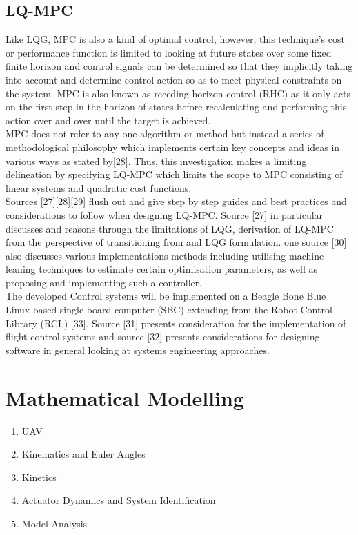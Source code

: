 \documentclass[12pt,a4paper,twoside]{report}
\begin{document}
			\subsection*{LQ-MPC}
				Like LQG, MPC is also a kind of optimal control, however, this technique’s cost or performance function is limited to looking at future states over some fixed finite horizon and control signals can be determined so that they implicitly taking into account and determine control action so as to meet physical constraints on the system. MPC is also known as receding horizon control (RHC) as it only acts on the first step in the horizon of states before recalculating and performing this action over and over until the target is achieved.
				\\ 
				MPC does not refer to any one algorithm or method but instead a series of methodological philosophy which implements certain key concepts and ideas in various ways as stated by[28]. Thus, this investigation makes a limiting delineation by specifying LQ-MPC which limits the scope to MPC consisting of linear systems and quadratic cost functions.
				\\ 
				Sources [27][28][29] flush out and give step by step guides and best practices and considerations to follow when designing LQ-MPC. Source [27] in particular discusses and reasons through the limitations of LQG, derivation of LQ-MPC from the perspective of transitioning from and LQG formulation. one source [30] also discusses various implementations methods including utilising machine leaning techniques to estimate certain optimisation parameters, as well as proposing and implementing such a controller.
				\\
				The developed Control systems will be implemented on a Beagle Bone Blue Linux based single board computer (SBC) extending from the Robot Control Library (RCL) [33]. Source [31] presents consideration for the implementation of flight control systems and source [32] presents considerations for designing software in general looking at systems engineering approaches.
			\newpage
			
	\section{Mathematical Modelling}
		
		\begin{enumerate}
			\item
				UAV
			\item 
				Kinematics and Euler Angles 
			\item 
				Kinetics
			\item 
				Actuator Dynamics and System Identification
			\item 
				Model Analysis
		\end{enumerate}
		
\end{document}
